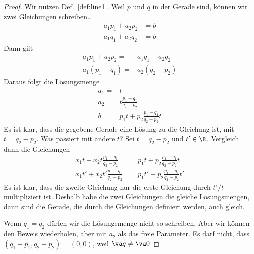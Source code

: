 \begin{proof}
	Wir nutzen Def.~\ref{def:line1}. Weil $p$ und $q$ in der Gerade sind, können wir zwei Gleichungen schreiben\ldots
	\begin{align*}
		a_1p_1+a_2p_2&=b\\
		a_1q_1+a_2q_2&=b
	\end{align*}
	Dann gilt
	\begin{align*}
		a_1p_1+a_2p_2=& a_1q_1+a_2q_2\\
		a_1(p_1-q_1)=& a_2(q_2-p_2)
	\end{align*}
	Daraus folgt die L\"{o}sungsmenge
	\begin{align*}
		a_1=&t\\
		a_2=&t\frac{p_1-q_1}{q_2-p_2}\\
		b=&p_1t+p_2\frac{p_1-q_1}{q_2-p_2}t
	\end{align*}
	Es ist klar, dass die gegebene Gerade eine Lösung zu die Gleichung ist, mit $t=q_2-p_2$. Was passiert mit andere $t$? Sei $t=q_2-p_2$ und $t'\in \R$. Vergleich dann die Gleichungen
	\begin{align*}
		x_1t+x_2t\frac{p_1-q_1}{q_2-p_2}=&p_1t+p_2\frac{p_1-q_1}{q_2-p_2}t\\
		x_1t'+x_2t'\frac{p_1-q_1}{q_2-p_2}=&p_1t'+p_2\frac{p_1-q_1}{q_2-p_2}t'
	\end{align*}
	Es ist klar, dass die zweite Gleichung nur die erste Gleichung durch $t' / t$ multipliziert ist. Deshalb habe die zwei Gleichungen die gleiche Lösungsmengen, dann sind die Gerade, die durch die Gleichungen definiert werden, auch gleich.

Wenn $q_1=q_2$ d\"{u}rfen wir die L\"{o}sungemenge nicht so schreiben. Aber wir k\"{o}nnen den Beweis wiederholen, aber mit $a_2$ als das freie Parameter. Es darf nicht, dass $\left( q_1-p_1,q_2-p_2 \right) =(0,0)$, weil $\va q\neq \va 0$
\end{proof}
